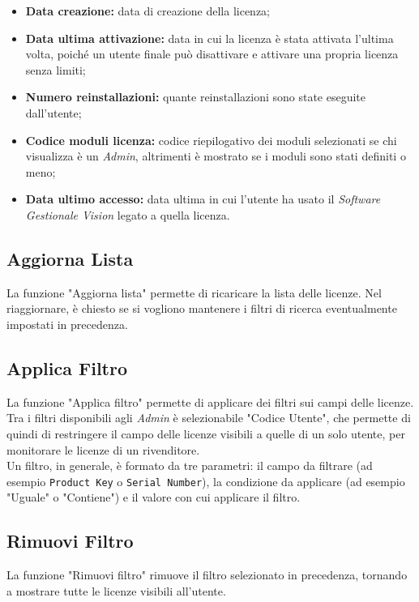 \begin{itemize}
\item \textbf{Data creazione:} data di creazione della licenza;
\item \textbf{Data ultima attivazione:} data in cui la licenza è stata attivata l’ultima volta, poiché un utente finale può disattivare e attivare una propria licenza senza limiti;
\item \textbf{Numero reinstallazioni:} quante reinstallazioni sono state eseguite dall’utente;
\item \textbf{Codice moduli licenza:} codice riepilogativo dei moduli selezionati se chi visualizza è un \textit{Admin}, altrimenti è mostrato se i moduli sono stati definiti o meno; 
\item \textbf{Data ultimo accesso:} data ultima in cui l’utente ha usato il \textit{Software Gestionale Vision} legato a quella licenza.

\end{itemize}

\subsection{Aggiorna Lista}
La funzione "Aggiorna lista" permette di ricaricare la lista delle licenze. Nel riaggiornare, è chiesto se si vogliono mantenere i filtri di ricerca eventualmente impostati in precedenza.

\subsection{Applica Filtro}
La funzione "Applica filtro" permette di applicare dei filtri sui campi delle licenze. Tra i filtri disponibili agli \textit{Admin} è selezionabile "Codice Utente", che permette di quindi di restringere il campo delle licenze visibili a quelle di un solo utente, per monitorare le licenze di un rivenditore.\\
Un filtro, in generale, è formato da tre parametri: il campo da filtrare (ad esempio \texttt{Product Key} o \texttt{Serial Number}), la condizione da applicare (ad esempio "Uguale" o "Contiene") e il valore con cui applicare il filtro.

\subsection{Rimuovi Filtro}
La funzione "Rimuovi filtro" rimuove il filtro selezionato in precedenza, tornando a mostrare tutte le licenze visibili all’utente.


